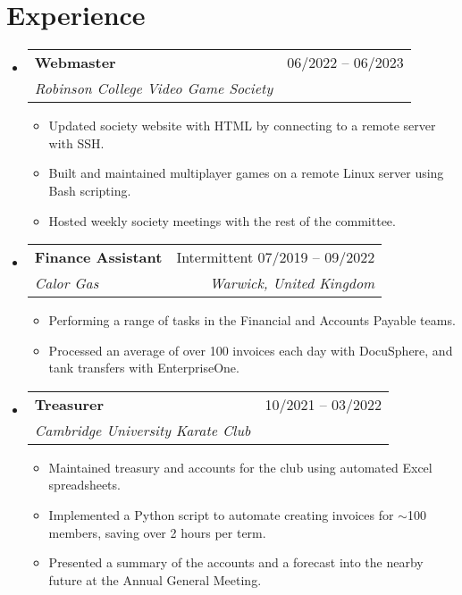 \documentclass[a4paper,11pt]{article}
\makeatletter
\newcommand{\resumeItem}[1]{
  \item{
    {#1 \vspace{-4pt}}
  }
}
\newcommand{\resumeSubheading}[4]{
  \vspace{-2pt}\item
    \begin{tabular*}{0.97\textwidth}[t]{l@{\extracolsep{\fill}}r}
      \textbf{#1} & #2 \\
      \textit{\small #3} & \textit{\small #4} \\
    \end{tabular*}\vspace{-10pt}
}
\newcommand{\resumeSubHeadingListStart}{\begin{itemize}[leftmargin=0.15in, label={}]}
\newcommand{\resumeSubHeadingListEnd}{\end{itemize}}
\newcommand{\resumeItemListStart}{\begin{itemize}}
\newcommand{\resumeItemListEnd}{\end{itemize}}
\makeatother
\begin{document}
\section{Experience}
\resumeSubHeadingListStart
\resumeSubheading
        {Webmaster}{06/2022 -- 06/2023}
        {Robinson College Video Game Society}{}
    \resumeItemListStart
        \small\resumeItem{Updated society website with HTML by connecting to a remote server with SSH.}
        \resumeItem{Built and maintained multiplayer games on a remote Linux server using Bash scripting.}
        \resumeItem{Hosted weekly society meetings with the rest of the committee.}
    \resumeItemListEnd
\begin{comment}
    \resumeSubheading
        {Treasurer}{June 2022 -- Present}
        {Robinson College Video Game Society}{}
    \resumeItemListStart
        \small\resumeItem{Maintained society accounts}
        \resumeItem{Run society events with the committee.}
    \resumeItemListEnd

    \resumeSubheading
        {Chairperson}{June 2022 -- Present}
        {Robinson College Board Game Society}{}
    \resumeItemListStart
        \small\resumeItem{Organised society meetings}
        \resumeItem{Created Excel spreadsheet to maintain society funds.}
    \resumeItemListEnd

    \resumeSubheading
        {Chairperson}{June 2022 -- Present}
        {Robinson College RPG Society}{}
\end{comment}
    \resumeSubheading
      {Finance Assistant}{Intermittent 07/2019 -- 09/2022}
      {Calor Gas}{Warwick, United Kingdom}
      \resumeItemListStart
        \small\resumeItem{Performing a range of tasks in the Financial and Accounts Payable teams.}
        \resumeItem{Processed an average of over 100 invoices each day with DocuSphere, and tank transfers with EnterpriseOne.}
        \resumeItemListEnd

\begin{comment}
    \resumeSubheading
        {Secretary}{June 2021 -- June 2022}
        {Robinson College Video Game Society}{}
    \resumeItemListStart
        \small\resumeItem{Minuted the society's Annual General Meeting.}
    \resumeItemListEnd
\end{comment}  
    \resumeSubheading
      {Treasurer}{10/2021 -- 03/2022}
      {Cambridge University Karate Club}{}
      \resumeItemListStart
        \small\resumeItem{Maintained treasury and accounts for the club using automated Excel spreadsheets.}
        \resumeItem{Implemented a Python script to automate creating invoices for $\sim$100 members, saving over 2 hours per term.}
        \resumeItem{Presented a summary of the accounts and a forecast into the nearby future at the Annual General Meeting.}
        \resumeItemListEnd
\begin{comment}
    \resumeSubheading
        {Crew Member}{October 2017 -- May 2020}
        {McDonald's}{Leamington Spa, United Kingdom}
    \resumeItemListStart
        \small\resumeItem{Experience working in a high-paced dynamic environment}
    \resumeItemListEnd
\end{comment}
\resumeSubHeadingListEnd
\end{document}

